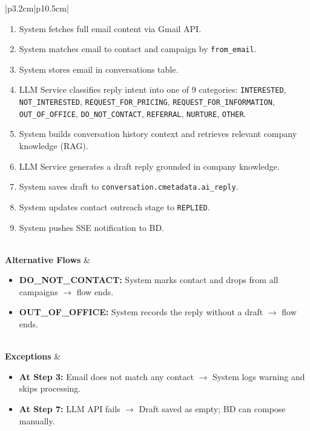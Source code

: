 \documentclass[a4paper]{article}
\begin{document}
\begin{table}[H]
\begin{tabular}{|p{3.2cm}|p{10.5cm}|}
\begin{minipage}[t]{\linewidth}
\begin{enumerate}[nosep,leftmargin=*]
  \item System fetches full email content via Gmail API.
  \item System matches email to contact and campaign by 
  \texttt{from\_email}.
  \item System stores email in conversations table.
    \item LLM Service classifies reply intent into one of 9
  categories: \texttt{INTERESTED}, \texttt{NOT\_INTERESTED},
  \texttt{REQUEST\_FOR\_PRICING},
  \texttt{REQUEST\_FOR\_INFORMATION}, \texttt{OUT\_OF\_OFFICE},
  \texttt{DO\_NOT\_CONTACT}, \texttt{REFERRAL}, \texttt{NURTURE},
  \texttt{OTHER}.
  \item System builds conversation history context and retrieves 
  relevant company knowledge (RAG).
  \item LLM Service generates a draft reply grounded in company 
  knowledge.
  \item System saves draft to 
  \texttt{conversation.cmetadata.ai\_reply}.
  \item System updates contact outreach stage to \texttt{REPLIED}.
  \item System pushes SSE notification to BD.
\end{enumerate}
\end{minipage} \\
\hline
\textbf{Alternative Flows} &
\begin{minipage}[t]{\linewidth}
\begin{itemize}[nosep,leftmargin=*]
  \item \textbf{DO\_NOT\_CONTACT:} System marks contact and drops 
  from all campaigns $\rightarrow$ flow ends.
    \item \textbf{OUT\_OF\_OFFICE:} System records the reply without a
  draft $\rightarrow$ flow ends.
\end{itemize}
\end{minipage} \\
\hline
\textbf{Exceptions} &
\begin{minipage}[t]{\linewidth}
\begin{itemize}[nosep,leftmargin=*]
  \item \textbf{At Step 3:} Email does not match any contact 
  $\rightarrow$ System logs warning and skips processing.
  \item \textbf{At Step 7:} LLM API fails $\rightarrow$ Draft 
  saved as empty; BD can compose manually.
\end{itemize}
\end{minipage} \\
\hline
\end{tabular}
\end{table}
\end{document}

